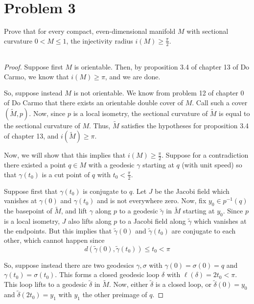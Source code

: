 \documentclass[fontsize=11pt]{scrartcl} %
\numberwithin{equation}{section} %
\numberwithin{figure}{section} %
\numberwithin{table}{section} %
\begin{document}
\newpage

\section*{Problem 3}
Prove that for every compact, even-dimensional manifold $M$ with sectional
curvature $0<M\leq 1$, the injectivity radius $i(M)\geq \frac{\pi}{2}$.
\\
\\
\begin{proof}
    Suppose first $M$ is orientable. Then, by proposition 3.4 of chapter 13 of
    Do Carmo, we know that $i(M)\geq \pi$, and we are done.

    So, suppose instead $M$ is not orientable. We know from problem 12 of
    chapter 0 of Do Carmo that there exists an orientable double cover of $M$.
    Call such a cover $(\tilde{M},p)$. Now, since $p$ is a local isometry, the
    sectional curvature of $\tilde{M}$ is equal to the sectional curvature of
    $M$. Thus, $\tilde{M}$ satisfies the hypotheses for proposition 3.4 of
    chapter 13, and $i(\tilde{M})\geq \pi$.

    Now, we will show that this implies that $i(M)\geq \frac{\pi}{2}$. Suppose
    for a contradiction there existed a point $q\in M$ with a geodesic $\gamma$
    starting at $q$ (with unit speed) so that $\gamma(t_0)$ is a cut point of
    $q$ with $t_0<\frac{\pi}{2}$.

    Suppose first that $\gamma(t_0)$ is conjugate to $q$. Let $J$ be the Jacobi
    field which vanishes at $\gamma(0)$ and $\gamma(t_0)$ and is not everywhere
    zero. Now, fix $y_0\in p^{-1}(q)$ the basepoint of $\tilde{M}$, and lift
    $\gamma$ along $p$ to a geodesic $\tilde{\gamma}$ in $\tilde{M}$ starting at
    $y_0$. Since $p$ is a local isometry, $J$ also lifts along $p$ to a Jacobi
    field along $\tilde{\gamma}$ which vanishes at the endpoints. But this
    implies that $\tilde{\gamma}(0)$ and $\tilde{\gamma}(t_0)$ are conjugate to
    each other, which cannot happen since
    \[
        d(\tilde{\gamma}(0),\tilde{\gamma}(t_0))\leq t_0<\pi
    \]

    So, suppose instead there are two geodesics $\gamma,\sigma$ with
    $\gamma(0)=\sigma(0)=q$ and $\gamma(t_0)=\sigma(t_0)$. This forms a closed
    geodesic loop $\delta$ with $\ell(\delta) = 2t_0 < \pi$. This loop lifts to
    a geodesic $\tilde{\delta}$ in $\tilde{M}$. Now, either $\tilde{\delta}$ is
    a closed loop, or $\tilde{\delta}(0)=y_0$ and $\tilde{\delta}(2t_0) = y_1$
    with $y_1$ the other preimage of $q$.


\end{proof}
\end{document}

